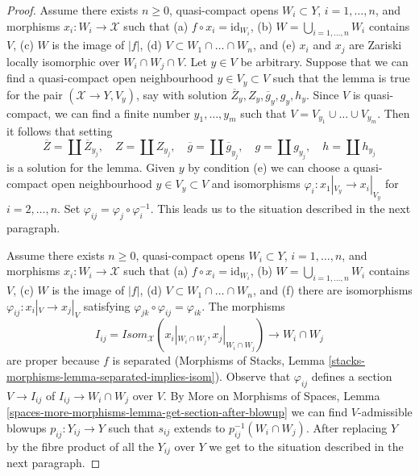 \documentclass[10pt,a4paper]{amsart}
\theoremstyle{plain}
\theoremstyle{definition}
\theoremstyle{remark}
\numberwithin{equation}{subsection}
\begin{document}
\begin{proof}
\medskip\noindent
Assume there exists $n \geq 0$, quasi-compact opens
$W_i \subset Y$, $i = 1, \ldots, n$, and
morphisms $x_i : W_i \to \mathcal{X}$ such that
(a) $f \circ x_i = \text{id}_{W_i}$,
(b) $W = \bigcup_{i = 1, \ldots, n} W_i$ contains $V$,
(c) $W$ is the image of $|f|$,
(d) $V \subset W_1 \cap \ldots \cap W_n$, and
(e) $x_i$ and $x_j$ are Zariski locally isomorphic over $W_i \cap W_j \cap V$.
Let $y \in V$ be arbitrary.
Suppose that we can find a quasi-compact open neighbourhood
$y \in V_y \subset V$ such that the lemma is true for
the pair $(\mathcal{X} \to Y, V_y)$, say with solution
$\overline{Z}_y, Z_y, \overline{g}_y, g_y, h_y$.
Since $V$ is quasi-compact, we can find a finite number
$y_1, \ldots, y_m$ such that $V = V_{y_1} \cup \ldots \cup V_{y_m}$.
Then it follows that setting
$$
\overline{Z} = \coprod \overline{Z}_{y_j},\quad
Z = \coprod Z_{y_j},\quad
\overline{g} = \coprod \overline{g}_{y_j},\quad
g = \coprod g_{y_j},\quad
h = \coprod h_{y_j}
$$
is a solution for the lemma. Given $y$ by condition (e)
we can choose a quasi-compact open neighbourhood $y \in V_y \subset V$
and isomorphisms $\varphi_i : x_1|_{V_y} \to x_i|_{V_y}$ for
$i = 2, \ldots, n$. Set $\varphi_{ij} = \varphi_j \circ \varphi_i^{-1}$.
This leads us to the situation described in the next paragraph.

\medskip\noindent
Assume there exists $n \geq 0$, quasi-compact opens
$W_i \subset Y$, $i = 1, \ldots, n$, and
morphisms $x_i : W_i \to \mathcal{X}$ such that
(a) $f \circ x_i = \text{id}_{W_i}$,
(b) $W = \bigcup_{i = 1, \ldots, n} W_i$ contains $V$,
(c) $W$ is the image of $|f|$,
(d) $V \subset W_1 \cap \ldots \cap W_n$, and
(f) there are isomorphisms $\varphi_{ij} : x_i|_V \to x_j|_V$
satisfying $\varphi_{jk} \circ \varphi_{ij} = \varphi_{ik}$.
The morphisms
$$
I_{ij} = \mathit{Isom}_\mathcal{X}(x_i|_{W_i \cap W_j},
x_j|_{W_i \cap W_j}) \longrightarrow W_i \cap W_j
$$
are proper because $f$ is separated
(Morphisms of Stacks, Lemma
\ref{stacks-morphisms-lemma-separated-implies-isom}).
Observe that $\varphi_{ij}$ defines a section $V \to I_{ij}$
of $I_{ij} \to W_i \cap W_j$ over $V$.
By More on Morphisms of Spaces, Lemma
\ref{spaces-more-morphisms-lemma-get-section-after-blowup}
we can find $V$-admissible blowups
$p_{ij} : Y_{ij} \to Y$ such that $s_{ij}$
extends to $p_{ij}^{-1}(W_i \cap W_j)$.
After replacing $Y$ by the fibre product of all the $Y_{ij}$
over $Y$ we get to the situation described in the next paragraph.


\end{proof}
\end{document}
